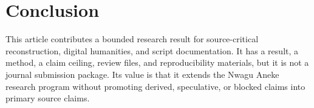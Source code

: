 \documentclass[sigconf,nonacm]{acmart}
\begin{document}
\section{Conclusion}
This article contributes a bounded research result for source-critical
reconstruction, digital humanities, and script documentation. It has a result, a
method, a claim ceiling, review files, and reproducibility materials, but it is
not a journal submission package. Its value is that it extends the Nwagu Aneke
research program without promoting derived, speculative, or blocked claims into
primary source claims.



\end{document}
